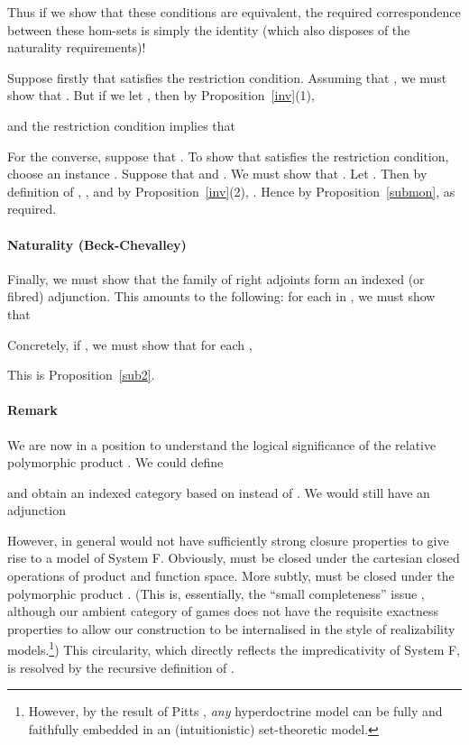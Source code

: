 \documentclass[a4paper,11pt]{article}
\begin{document}
Thus if we show that these conditions are equivalent, the required
correspondence between these hom-sets is simply the identity (which
also disposes of the naturality requirements)!

Suppose firstly that  satisfies the restriction
condition. Assuming that , we must show that
. But if we let , then by Proposition~\ref{inv}(1),

and the restriction condition implies that

For the converse, suppose that . To show that  satisfies the restriction
condition, choose an instance . Suppose that  and . We must show that
. Let . Then by definition of ,
    , and by Proposition~\ref{inv}(2), . Hence by Proposition~\ref{submon},  as required. 

\paragraph{Naturality (Beck-Chevalley)}
Finally, we must show that the family of right adjoints  form
an indexed (or fibred) adjunction. This amounts to the following: for
each  in , we must show that

Concretely, if , we must show that for each ,

This is Proposition~\ref{sub2}.

\paragraph{Remark}
We are now in a position to understand the logical significance of the relative polymorphic product . We could define

and obtain an indexed category  based on  instead of . We would still have an adjunction

However, in general  would not have sufficiently strong closure
properties to give rise to a model of System F. Obviously, 
must be closed under the cartesian closed operations of product and
function space. More subtly,  must be closed under the
polymorphic product . (This is, essentially, the
``small completeness'' issue \cite{Hyl88}, although our ambient category of
games does not have the requisite exactness properties to allow our
construction to be internalised in the style of realizability
models.\footnote{However, by the result of Pitts \cite{Pit88}, \emph{any}
hyperdoctrine model can be fully and faithfully embedded in an
(intuitionistic) set-theoretic model.}) This circularity, which directly reflects the impredicativity of System F, is resolved by the recursive definition of .
\end{document}
